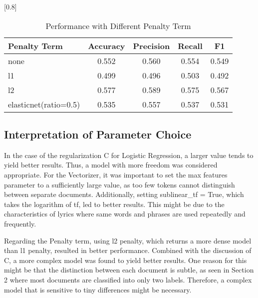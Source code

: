 \documentclass[a4paper,11pt]{article}
\begin{document}
\begin{table}[htbp]
    \centering
    \caption{Performance with Different Penalty Term}
    \scalebox{0.8}[0.8]{
    \begin{tabular}{l|cccc}
        Penalty Term & Accuracy & Precision & Recall & F1 \\ \hline 
        none & 0.552 & 0.560 & 0.554 & 0.549 \\ 
        l1 & 0.499 & 0.496 & 0.503 & 0.492 \\
        \rowcolor[rgb]{0.9,0.9,0}l2 & 0.577 & 0.589 & 0.575 & 0.567 \\
        elasticnet(ratio=0.5) & 0.535 & 0.557 & 0.537 & 0.531 \\



    \end{tabular}

    }
\end{table}
\subsection{Interpretation of Parameter Choice}


In the case of the regularization C for Logistic Regression, a larger value tends to yield better results.
Thus, a model with more freedom was considered appropriate. 
For the Vectorizer, it was important to set the max features parameter to a sufficiently large value, 
as too few tokens cannot distinguish between separate documents.
Additionally, setting sublinear\_tf = True, which takes the logarithm of tf, led to better results.
This might be due to the characteristics of lyrics where same words and phrases are used repeatedly and frequently.

Regarding the Penalty term, using l2 penalty, which returns a more dense model than l1 penalty, resulted in better performance.
Combined with the discussion of C, a more complex model was found to yield better results.
One reason for this might be that the distinction between each document is subtle, as seen in Section 2 where most documents are classified into only two labels. 
Therefore, a complex model that is sensitive to tiny differences might be necessary.

\end{document}

